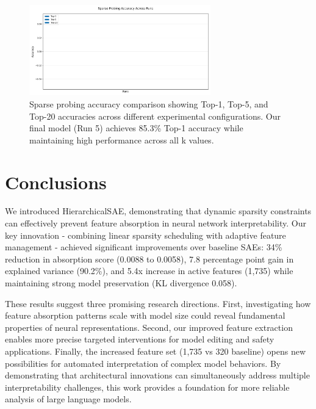 \documentclass{article} %
\begin{document}
\begin{figure}[h]
    \centering
    \includegraphics[width=0.7\textwidth]{probing_accuracy.png}
    \caption{Sparse probing accuracy comparison showing Top-1, Top-5, and Top-20 accuracies across different experimental configurations. Our final model (Run 5) achieves 85.3\% Top-1 accuracy while maintaining high performance across all k values.}
    \label{fig:probing}
\end{figure}

\section{Conclusions}
\label{sec:conclusion}

We introduced HierarchicalSAE, demonstrating that dynamic sparsity constraints can effectively prevent feature absorption in neural network interpretability. Our key innovation - combining linear sparsity scheduling with adaptive feature management - achieved significant improvements over baseline SAEs: 34\% reduction in absorption score (0.0088 to 0.0058), 7.8 percentage point gain in explained variance (90.2\%), and 5.4x increase in active features (1,735) while maintaining strong model preservation (KL divergence 0.058).

These results suggest three promising research directions. First, investigating how feature absorption patterns scale with model size could reveal fundamental properties of neural representations. Second, our improved feature extraction enables more precise targeted interventions for model editing and safety applications. Finally, the increased feature set (1,735 vs 320 baseline) opens new possibilities for automated interpretation of complex model behaviors. By demonstrating that architectural innovations can simultaneously address multiple interpretability challenges, this work provides a foundation for more reliable analysis of large language models.



\end{document}
